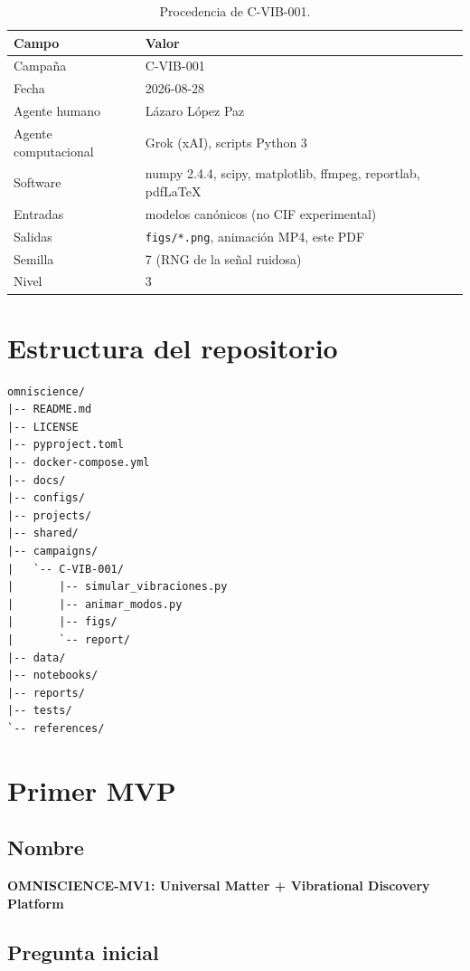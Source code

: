\documentclass[11pt,a4paper]{article}
\begin{document}
\begin{table}[H]
\centering
\caption{Procedencia de C-VIB-001.}
\label{tab:prov}
\begin{tabular}{>{\raggedright\arraybackslash}p{3.6cm}p{9.6cm}}
\toprule
Campo & Valor \\
\midrule
Campaña & C-VIB-001 \\
Fecha & 2026-08-28 \\
Agente humano & Lázaro López Paz \\
Agente computacional & Grok (xAI), scripts Python 3 \\
Software & numpy 2.4.4, scipy, matplotlib, ffmpeg, reportlab, pdf\LaTeX \\
Entradas & modelos canónicos (no CIF experimental) \\
Salidas & \texttt{figs/*.png}, animación MP4, este PDF \\
Semilla & 7 (RNG de la señal ruidosa) \\
Nivel & 3 \\
\bottomrule
\end{tabular}
\end{table}

\section{Estructura del repositorio}

\begin{lstlisting}
omniscience/
|-- README.md
|-- LICENSE
|-- pyproject.toml
|-- docker-compose.yml
|-- docs/
|-- configs/
|-- projects/
|-- shared/
|-- campaigns/
|   `-- C-VIB-001/
|       |-- simular_vibraciones.py
|       |-- animar_modos.py
|       |-- figs/
|       `-- report/
|-- data/
|-- notebooks/
|-- reports/
|-- tests/
`-- references/
\end{lstlisting}

\section{Primer MVP}

\subsection{Nombre}

\textbf{OMNISCIENCE-MV1: Universal Matter + Vibrational Discovery Platform}

\subsection{Pregunta inicial}
\end{document}
